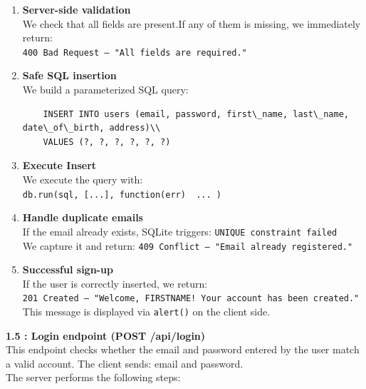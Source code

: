 \documentclass[11pt,a4paper]{report}
\begin{document}
\begin{enumerate}
    \item \textbf{Server-side validation}\\
    We check that all fields are present.If any of them is missing, we immediately return:\\
    \texttt{400 Bad Request – "All fields are required."}
    \item \textbf{Safe SQL insertion}\\
    We build a parameterized SQL query:\\
    \begin{lstlisting}
    INSERT INTO users (email, password, first\_name, last\_name, date\_of\_birth, address)\\
    VALUES (?, ?, ?, ?, ?, ?)
    \end{lstlisting}
    \item \textbf{Execute Insert}\\
    We execute the query with:\\
    \texttt{db.run(sql, [...], function(err) { ... })}
    \item\textbf{Handle duplicate emails}\\
    If the email already exists, SQLite triggers: \texttt{UNIQUE constraint failed}\\
    We capture it and return: \texttt{409 Conflict – "Email already registered."}
    \item\textbf{Successful sign-up}\\
    If the user is correctly inserted, we return:\\
    \texttt{201 Created – "Welcome, FIRSTNAME! Your account has been created."}\\
    This message is displayed via \texttt{alert()} on the client side.
\end{enumerate}

\textbf{1.5 : Login endpoint  (POST /api/login)}\\
This endpoint checks whether the email and password entered by the user match a valid account. The client sends: email and password.\\
The server performs the following steps:\\
\end{document}
